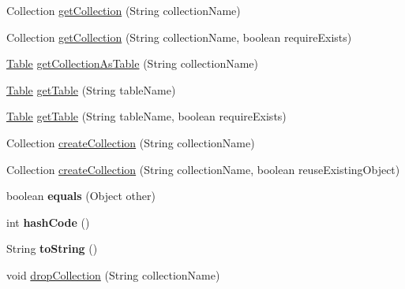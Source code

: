 \begin{DoxyCompactItemize}
\item 
Collection \mbox{\hyperlink{classcom_1_1mysql_1_1cj_1_1xdevapi_1_1_schema_impl_abcdaa1e922b045e78ed4748279042ed9}{get\+Collection}} (String collection\+Name)
\item 
Collection \mbox{\hyperlink{classcom_1_1mysql_1_1cj_1_1xdevapi_1_1_schema_impl_a465ae06f3ba56080cbc7405ff428f01b}{get\+Collection}} (String collection\+Name, boolean require\+Exists)
\item 
\mbox{\hyperlink{interfacecom_1_1mysql_1_1cj_1_1xdevapi_1_1_table}{Table}} \mbox{\hyperlink{classcom_1_1mysql_1_1cj_1_1xdevapi_1_1_schema_impl_a8382999acc577f81226c60bfa015a8a9}{get\+Collection\+As\+Table}} (String collection\+Name)
\item 
\mbox{\hyperlink{interfacecom_1_1mysql_1_1cj_1_1xdevapi_1_1_table}{Table}} \mbox{\hyperlink{classcom_1_1mysql_1_1cj_1_1xdevapi_1_1_schema_impl_a47c591b1796cbcb04985088ad3cbaad7}{get\+Table}} (String table\+Name)
\item 
\mbox{\hyperlink{interfacecom_1_1mysql_1_1cj_1_1xdevapi_1_1_table}{Table}} \mbox{\hyperlink{classcom_1_1mysql_1_1cj_1_1xdevapi_1_1_schema_impl_a6bef049505f3d49b68e56fb2169dc165}{get\+Table}} (String table\+Name, boolean require\+Exists)
\item 
Collection \mbox{\hyperlink{classcom_1_1mysql_1_1cj_1_1xdevapi_1_1_schema_impl_a36cc97bce57ffb6124bc7f25ee6ed60e}{create\+Collection}} (String collection\+Name)
\item 
Collection \mbox{\hyperlink{classcom_1_1mysql_1_1cj_1_1xdevapi_1_1_schema_impl_a723a878ef263bfeec2efcf434849da84}{create\+Collection}} (String collection\+Name, boolean reuse\+Existing\+Object)
\item 
\mbox{\label{classcom_1_1mysql_1_1cj_1_1xdevapi_1_1_schema_impl_af8aa5d4ff38f013efaa8b38955b6327d}} 
boolean {\bfseries equals} (Object other)
\item 
\mbox{\label{classcom_1_1mysql_1_1cj_1_1xdevapi_1_1_schema_impl_ac5823bc78000f3e7241045caf9122578}} 
int {\bfseries hash\+Code} ()
\item 
\mbox{\label{classcom_1_1mysql_1_1cj_1_1xdevapi_1_1_schema_impl_a75d95d9f6bc42e795afc262f4acb7664}} 
String {\bfseries to\+String} ()
\item 
void \mbox{\hyperlink{classcom_1_1mysql_1_1cj_1_1xdevapi_1_1_schema_impl_a8420b65714f543e4bd4a113edeadeb14}{drop\+Collection}} (String collection\+Name)
\end{DoxyCompactItemize}


